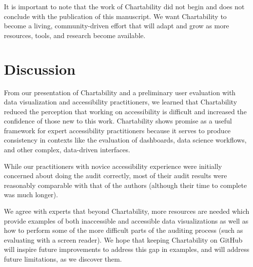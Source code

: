 \documentclass[12pt]{cmuthesis}
\begin{document}
It is important to note that the work of Chartability did not begin and does not conclude with the publication of this manuscript. We want Chartability to become a living, community-driven effort that will adapt and grow as more resources, tools, and research become available.

\section{Discussion}
From our presentation of Chartability and a preliminary user evaluation with data visualization and accessibility practitioners, we learned that Chartability reduced the perception that working on accessibility is difficult and increased the confidence of those new to this work. Chartability shows promise as a useful framework for expert accessibility practitioners because it serves to produce consistency in contexts like the evaluation of dashboards, data science workflows, and other complex, data-driven interfaces. 

While our practitioners with novice accessibility experience were initially concerned about doing the audit correctly, most of their audit results were reasonably comparable with that of the authors (although their time to complete was much longer). 

We agree with experts that beyond Chartability, more resources are needed which provide examples of both inaccessible and accessible data visualizations as well as how to perform some of the more difficult parts of the auditing process (such as evaluating with a screen reader). We hope that keeping Chartability on GitHub will inspire future improvements to address this gap in examples, and will address future limitations, as we discover them. 
\end{document}
